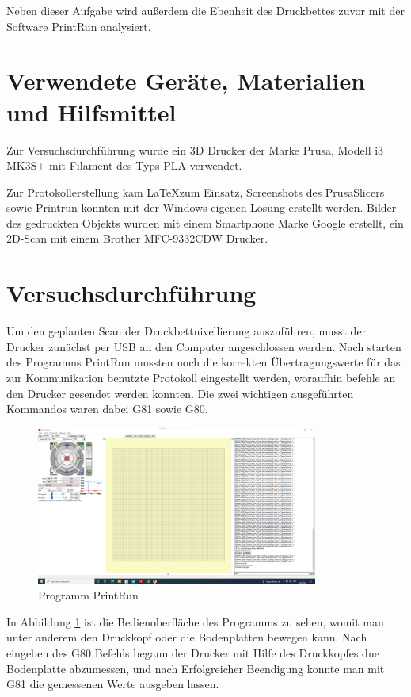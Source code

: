 \documentclass[a4paper,12pt,bibtotocnumbered]{scrartcl}
\numberwithin{equation}{section} %
\begin{document}
Neben dieser Aufgabe wird außerdem die Ebenheit des Druckbettes zuvor mit der Software PrintRun analysiert.

\section[Verwendete Geräte, Materialien und Hilfsmittel]{Verwendete Geräte, Materialien und Hilfsmittel}

Zur Versuchsdurchführung wurde ein 3D Drucker der Marke Prusa, Modell i3 MK3S+ mit Filament des Typs PLA verwendet.

Zur Protokollerstellung kam \LaTeX\;zum Einsatz, Screenshots des PrusaSlicers sowie Printrun konnten mit der Windows eigenen Lösung erstellt werden. Bilder des gedruckten Objekts wurden mit einem Smartphone Marke Google erstellt, ein 2D-Scan mit einem Brother MFC-9332CDW Drucker.

\section[Versuchsdurchführung]{Versuchsdurchführung}

Um den geplanten Scan der Druckbettnivellierung auszuführen, musst der Drucker zunächst per USB an den Computer angeschlossen werden. Nach starten des Programms PrintRun mussten noch die korrekten Übertragungswerte für das zur Kommunikation benutzte Protokoll eingestellt werden, woraufhin befehle an den Drucker gesendet werden konnten. Die zwei wichtigen ausgeführten Kommandos waren dabei G81 sowie G80.

\begin{figure}[H]
	\centerline{\includegraphics[width=350px]{./images/printrun.png}}
	\caption{Programm PrintRun}
	\label{printrun}
	\end{figure}

In Abbildung \ref*{printrun} ist die Bedienoberfläche des Programms zu sehen, womit man unter anderem den Druckkopf oder die Bodenplatten bewegen kann. Nach eingeben des G80 Befehls begann der Drucker mit Hilfe des Druckkopfes due Bodenplatte abzumessen, und nach Erfolgreicher Beendigung konnte man mit G81 die gemessenen Werte ausgeben lassen.
\end{document}
